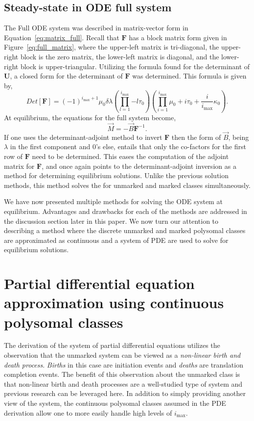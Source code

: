 \documentclass[review]{elsarticle}
\newcommand{\imax}{\ensuremath{i_{\max}}\xspace}
\let\bs\boldsymbol
\begin{document}
\subsection{Steady-state in ODE full system}
The Full ODE system was described in matrix-vector form in Equation~\ref{eq:matrix_full}.
Recall that $\bs{F}$ has a block matrix form given in Figure~\ref{eq:full_matrix}, where the upper-left matrix is tri-diagonal, the upper-right block is the zero matrix, the lower-left matrix is diagonal, and the lower-right block is upper-triangular.
Utilizing the formula found for the determinant of $\bs{U}$, a closed form for the determinant of $\bs{F}$ was determined.
This formula is given by,
\begin{equation}\label{eq:full_matrix_det}
Det[\bs{F}]=(-1)^{\imax+1}\mu_0 \delta \lambda \left(\prod_{l=1}^{\imax}{-l\tau_0}\right)\left(\prod_{i=1}^{\imax}{\mu_0 +i \tau_0 + \frac{i}{\imax}\kappa_0}\right).
\end{equation}
At equilibrium, the equations for the full system become,
\begin{equation}
\vec{M}=-\vec{B}\bs{F}^{-1}.
\end{equation}
If one uses the determinant-adjoint method to invert $\bs{F}$ then the form of $\vec{B}$, being $\lambda$ in the first component and 0's else, entails that only the co-factors for the first row of $\bs{F}$ need to be determined.
This eases the computation of the adjoint matrix for $\bs{F}$, and once again points to the determinant-adjoint inversion as a method for determining equilibrium solutions.
Unlike the previous solution methods, this method solves the for unmarked and marked classes simultaneously.

We have now presented multiple methods for solving the ODE system at equilibrium.
Advantages and drawbacks for each of the methods are addressed in the discussion section later in this paper.
We now turn our attention to describing a method where the discrete unmarked and marked polysomal classes are approximated as continuous and a system of PDE are used to solve for equilibrium solutions.

\section{Partial differential equation approximation using continuous polysomal classes}
The derivation of the system of partial differential equations utilizes the observation that the unmarked system can be viewed as a \emph{non-linear birth and death process}. \emph{Births} in this case are initiation events and \emph{deaths} are translation completion events.
The benefit of this observation about the unmarked class is that non-linear birth and death processes are a well-studied type of system and previous research can be leveraged here.
In addition to simply providing another view of the system, the continuous polysomal classes assumed in the PDE derivation allow one to more easily handle high levels of \imax.
\end{document}
